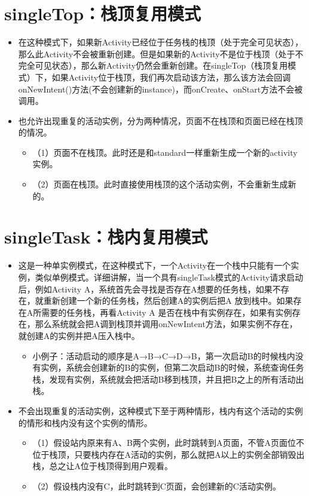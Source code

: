 \documentclass[9pt, b5paaper]{book}
\begin{document}
\section{singleTop：栈顶复用模式}
\label{sec-4-2}
\begin{itemize}
\item 在这种模式下，如果新Activity已经位于任务栈的栈顶（处于完全可见状态），那么此Activity不会被重新创建。但是如果新的Activity不是位于栈顶（处于不完全可见状态），那么新Activity仍然会重新创建。在singleTop（栈顶复用模式）下，如果Activity位于栈顶，我们再次启动该方法，那么该方法会回调onNewIntent()方法(不会创建新的instance)，而onCreate、onStart方法不会被调用。
\item 也允许出现重复的活动实例，分为两种情况，页面不在栈顶和页面已经在栈顶的情况。
\begin{itemize}
\item （1）页面不在栈顶。此时还是和standard一样重新生成一个新的activity实例。
\item （2）页面在栈顶。此时直接使用栈顶的这个活动实例，不会重新生成新的。
\end{itemize}
\end{itemize}

\section{singleTask：栈内复用模式}
\label{sec-4-3}
\begin{itemize}
\item 这是一种单实例模式，在这种模式下，一个Activity在一个栈中只能有一个实例，类似单例模式。详细讲解，当一个具有singleTask模式的Activity请求启动后，例如Activity A，系统首先会寻找是否存在A想要的任务栈，如果不存在，就重新创建一个新的任务栈，然后创建A的实例后把A 放到栈中。如果存在A所需要的任务栈，再看Activity A 是否在栈中有实例存在，如果有实例存在，那么系统就会把A调到栈顶并调用onNewIntent方法，如果实例不存在，就创建A的实例并把A压入栈中。 
\begin{itemize}
\item 小例子：活动启动的顺序是A→B→C→D→B，第一次启动B的时候栈内没有实例，系统会创建新的B的实例，但第二次启动B的时候，系统查询任务栈，发现有实例，系统就会把活动B移到栈顶，并且把B之上的所有活动出栈。
\end{itemize}
\item 不会出现重复的活动实例，这种模式下至于两种情形，栈内有这个活动的实例的情形和栈内没有这个实例的情形。
\begin{itemize}
\item （1）假设站内原来有A、B两个实例，此时跳转到A页面，不管A页面位不位于栈顶，只要栈内存在A活动的实例，那么就把A以上的实例全部销毁出栈，总之让A位于栈顶得到用户观看。
\item （2）假设栈内没有C，此时跳转到C页面，会创建新的C活动实例。
\end{itemize}
\end{itemize}
\end{document}
